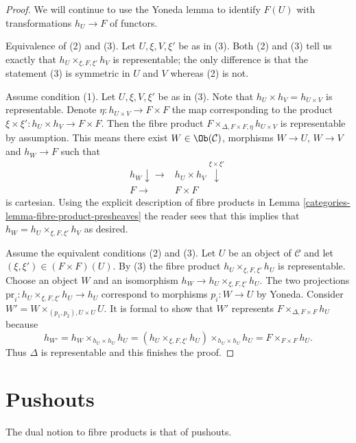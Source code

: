 \begin{proof}

We will continue to use the Yoneda lemma to identify $F(U)$
with transformations $h_U \to F$ of functors.

\medskip\noindent
Equivalence of (2) and (3). Let $U, \xi, V, \xi'$ be as in (3).
Both (2) and (3) tell us exactly that $h_U \times_{\xi, F, \xi'} h_V$
is representable; the only difference is that the statement
(3) is symmetric in $U$ and $V$ whereas (2) is not.

\medskip\noindent
Assume condition (1). Let $U, \xi, V, \xi'$
be as in (3). Note that $h_U \times h_V = h_{U \times V}$ is representable.
Denote $\eta : h_{U \times V} \to F \times F$ the map
corresponding to the product $\xi \times \xi' : h_U \times h_V \to F \times F$.
Then the fibre product $F \times_{\Delta, F \times F, \eta} h_{U \times V}$
is representable by assumption. This means there exist
$W \in \Ob(\mathcal{C})$, morphisms
$W \to U$, $W \to V$ and $h_W \to F$ such that
$$
\begin{array}{cc}h_W \downarrow\longrightarrow & h_U \times h_V \overset{\xi \times \xi'}{\downarrow} \\ F \longrightarrow & F \times F\end{array}
$$
is cartesian. Using the explicit description of fibre products
in Lemma \ref{categories-lemma-fibre-product-presheaves} the reader sees that this
implies that $h_W = h_U \times_{\xi, F, \xi'} h_V$ as desired.

\medskip\noindent
Assume the equivalent conditions (2) and (3). Let $U$ be an object
of $\mathcal{C}$ and let $(\xi, \xi') \in (F \times F)(U)$.
By (3) the fibre product $h_U \times_{\xi, F, \xi'} h_U$ is
representable. Choose an object $W$ and an isomorphism
$h_W \to h_U \times_{\xi, F, \xi'} h_U$. The two projections
$\text{pr}_i : h_U \times_{\xi, F, \xi'} h_U \to h_U$
correspond to morphisms $p_i : W \to U$ by Yoneda. Consider
$W' = W \times_{(p_1, p_2), U \times U} U$. It is formal
to show that $W'$ represents $F \times_{\Delta, F \times F} h_U$
because
$$
h_{W'} = h_W \times_{h_U \times h_U} h_U
= (h_U \times_{\xi, F, \xi'} h_U) \times_{h_U \times h_U} h_U
= F \times_{F \times F} h_U.
$$
Thus $\Delta$ is representable and this finishes the proof.
\end{proof}

\section{Pushouts}
\label{categories-section-pushouts}
The dual notion to fibre products is that of pushouts.


